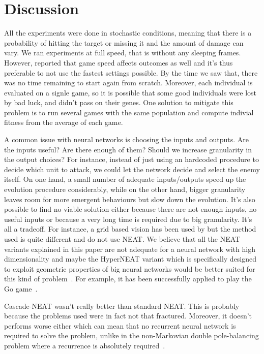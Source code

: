 \section{Discussion}\label{section:discussion}

All the experiments were done in stochastic conditions, meaning that
there is a probability of hitting the target or missing it and the
amount of damage can vary.  We ran experiments at full speed, that is
without any sleeping frames.  However, \citet{Liu14EffectiveMicro}
reported that game speed affects outcomes as well and it's thus
preferable to not use the fastest settings possible.  By the time we
saw that, there was no time remaining to start again from scratch.
Moreover, each individual is evaluated on a signle game, so it is possible
that some good individuals were lost by bad luck, and didn't pass on
their genes. One solution to mitigate this problem is to run
several games with the same population and compute indivial fitness
from the average of each game.

A common issue with neural networks is choosing the inputs and
outputs. Are the inputs useful? Are there enough of them? Should we
increase granularity in the output choices? For instance, instead of
just using an hardcoded procedure to decide which unit to attack, we
could let the network decide and select the enemy itself. On one hand,
a small number of adequate inputs/outputs speed up the evolution
procedure considerably, while on the other hand, bigger granularity
leaves room for more emergent behaviours but slow down the
evolution. It's also possible to find no viable solution either
because there are not enough inputs, no useful inputs or because a
very long time is required due to big granularity. It's all a
tradeoff.  For instance, a grid based vision has been used by
\citet{Shantia11ConnectionistSC} but the method used is quite
different and do not use NEAT. We believe that all the NEAT variants
explained in this paper are not adequate for a neural network with
high dimensionality and maybe the HyperNEAT variant which is
specifically designed to exploit geometric properties of big neural
networks would be better suited for this kind of
problem~\cite{Stanley09HyperNEAT, Gauci10TopographicRegularities}. For
example, it has been successfully applied to play the Go
game~\cite{Gauci10Go}.

Cascade-NEAT wasn't really better than standard NEAT.  This is
probably because the problems used were in fact not that fractured.
Moreover, it doesn't performs worse either which can mean that no
recurrent neural network is required to solve the problem, unlike in
the non-Markovian double pole-balancing problem where a recurrence is
absolutely required~\cite{Kohl09FracturedProblems}.

